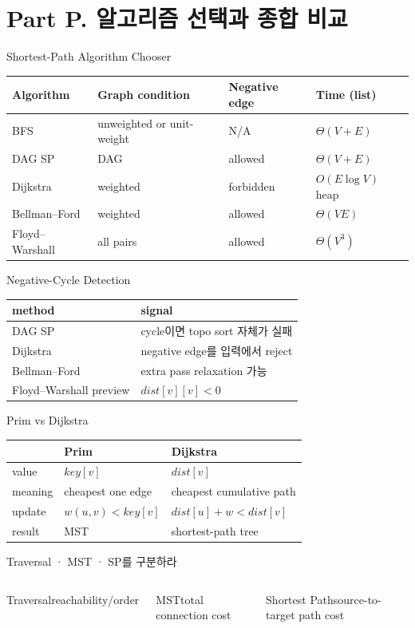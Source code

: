 \section{Part P. 알고리즘 선택과 종합 비교}
\begin{frame}{Shortest-Path Algorithm Chooser}
\scriptsize\centering\begin{tabular}{llll}\toprule
Algorithm&Graph condition&Negative edge&Time (list)\\\midrule
BFS&unweighted or unit-weight&N/A&\(\Theta(V+E)\)\\
DAG SP&DAG&allowed&\(\Theta(V+E)\)\\
Dijkstra&weighted&forbidden&\(O(E\log V)\) heap\\
Bellman--Ford&weighted&allowed&\(\Theta(VE)\)\\
Floyd--Warshall&all pairs&allowed&\(\Theta(V^3)\)\\\bottomrule
\end{tabular}
\end{frame}
\begin{frame}{Negative-Cycle Detection}
\small\begin{tabular}{ll}\toprule
method&signal\\\midrule
DAG SP&cycle이면 topo sort 자체가 실패\\
Dijkstra&negative edge를 입력에서 reject\\
Bellman--Ford&extra pass relaxation 가능\\
Floyd--Warshall preview&\(dist[v][v]<0\)\\\bottomrule
\end{tabular}
\end{frame}
\begin{frame}{Prim vs Dijkstra}
\small\begin{tabular}{lll}\toprule&Prim&Dijkstra\\\midrule
value&\(key[v]\)&\(dist[v]\)\\meaning&cheapest one edge&cheapest cumulative path\\update&\(w(u,v)<key[v]\)&\(dist[u]+w<dist[v]\)\\result&MST&shortest-path tree\\\bottomrule\end{tabular}
\end{frame}
\begin{frame}{Traversal · MST · SP를 구분하라}
\begin{columns}[T]\begin{block}{Traversal}reachability/order\end{block}
\begin{block}{MST}total connection cost\end{block}
\begin{block}{Shortest Path}source-to-target path cost\end{block}\end{columns}
\end{frame}
